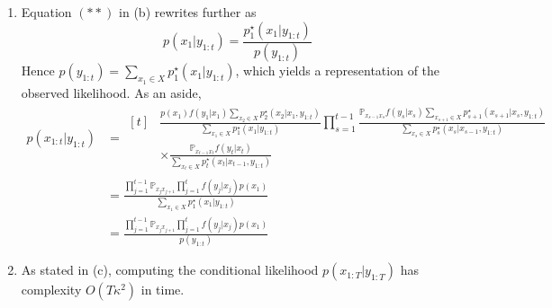 \documentclass[a4paper,11pt, hidelinks]{article}
\begin{document}
\begin{enumerate}[label=(\alph*)]
	\item Equation $(**)$ in (b) rewrites further as $$p(x_1|y_{1:t}) =  \frac{p_1^\star(x_1|y_{1:t})}{p(y_{1:t})}$$
	Hence $p(y_{1:t}) = \sum_{x_1\in X} p_1^\star(x_1|y_{1:t})$, which yields a representation of the observed likelihood.\newline \newline
	As an aside, $$\begin{aligned}
	p(x_{1:t}|y_{1:t})  &= \begin{aligned}[t]&\frac{p(x_1) f(y_1|x_1) \sum_{x_2\in X} p_2^\star(x_2|x_1,y_{1:t})}{\sum_{x_1\in X} p_1^\star(x_1|y_{1:t})} \prod_{s=1}^{t-1} \frac{\mathbb P_{x_{s-1} x_s} f(y_s|x_s) \sum_{x_{s+1}\in X} p_{s+1}^\star(x_{s+1}|x_{s},y_{1:t})}{\sum_{x_s\in X} p_s^\star(x_s|x_{s-1},y_{1:t})}\\ &\times \frac{\mathbb P_{x_{t-1} x_t} f(y_t|x_t)}{\sum_{x_t\in X} p_t^\star(x_t|x_{t-1},y_{1:t})}\end{aligned}\\
	&= \frac{\prod_{j=1}^{t-1}\mathbb P_{x_{j} x_{j+1}} \prod_{j=1}^{t}f(y_j|x_j)p(x_1)}{\sum_{x_1\in X} p_1^\star(x_1|y_{1:t})}\\
	&= \frac{\prod_{j=1}^{t-1}\mathbb P_{x_{j} x_{j+1}} \prod_{j=1}^{t}f(y_j|x_j)p(x_1)}{p(y_{1:t})}
	\end{aligned}
	$$
	
	\item As stated in (c), computing the conditional likelihood $p(x_{1:T}|y_{1:T})$ has complexity $O(T\kappa^2)$ in time.
\end{enumerate}

\newpage


\end{document}
